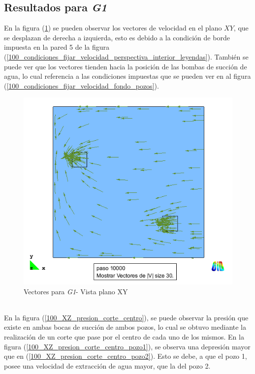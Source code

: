\documentclass[10pt,a4paper,final]{article}
\begin{document}
\subsection{Resultados para \emph{G1}}
En la figura (\ref{100_xy_vectores}) se pueden observar los vectores de velocidad en el plano $XY$, que se desplazan de derecha a izquierda, esto es debido a la condición de borde impuesta en la pared 5 de la figura (\ref{100_condiciones_fijar_velocidad_perspectiva_interior_leyendas}). También se puede ver que los vectores tienden hacia la posición de las bombas de succión de agua, lo cual referencia a las condiciones impuestas que se pueden ver en al figura (\ref{100_condiciones_fijar_velocidad_fondo_pozos}).
%
\begin{figure}[tbhp]
\centerline{\includegraphics[scale=0.5]{img/100m/resul/100_xy_vectores}}
\caption{Vectores para \emph{G1}- Vista plano XY}
\label{100_xy_vectores}
\end{figure}
%
\\
En la figura (\ref{100_XZ_presion_corte_centro}), se puede observar la presión que existe en ambas bocas de succión de ambos pozos, lo cual se obtuvo mediante la realización de un corte que pase por el centro de cada uno de los mismos. En la figura (\ref{100_XZ_presion_corte_centro_pozo1}), se observa una depresión mayor que en (\ref{100_XZ_presion_corte_centro_pozo2}). Esto se debe, a que el pozo 1, posee una velocidad de extracción de agua mayor, que la del pozo 2.
%
\end{document}
